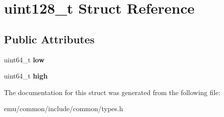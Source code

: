 \hypertarget{structuint128__t}{}\section{uint128\+\_\+t Struct Reference}
\label{structuint128__t}
\subsection*{Public Attributes}
\begin{DoxyCompactItemize}
\item 
\mbox{\label{structuint128__t_a2f03c629eb48944a860ce00fdd348b9c}} 
uint64\+\_\+t {\bfseries low}
\item 
\mbox{\label{structuint128__t_a9c3e19185a05e6ba23b390b4bfb8d78c}} 
uint64\+\_\+t {\bfseries high}
\end{DoxyCompactItemize}


The documentation for this struct was generated from the following file\+:\begin{DoxyCompactItemize}
\item 
emu/common/include/common/types.\+h\end{DoxyCompactItemize}
